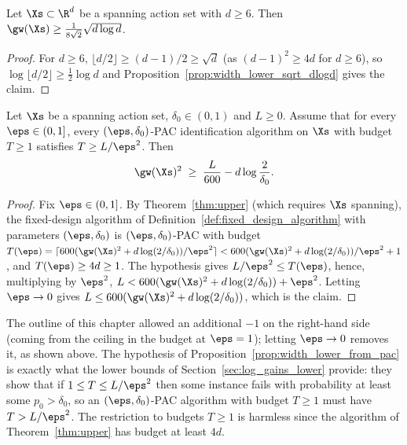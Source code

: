 \begin{corollary}\label{cor:width_lower_sqrt_dlogd}
Let $\Xs \subset \R^d$ be a spanning action set with $d \ge 6$. Then
$\gw(\Xs) \ge \frac{1}{8\sqrt 2}\sqrt{d\log d}$.
\end{corollary}
\begin{proof}
For $d \ge 6$, $\lfloor d/2\rfloor \ge (d-1)/2 \ge \sqrt d$ (as $(d-1)^2 \ge 4d$ for $d \ge 6$), so
$\log\lfloor d/2\rfloor \ge \frac12\log d$ and Proposition~\ref{prop:width_lower_sqrt_dlogd} gives
the claim.
\end{proof}


\begin{proposition}\label{prop:width_lower_from_pac}
Let $\Xs$ be a spanning action set, $\delta_0 \in (0,1)$ and $L \ge 0$. Assume that for every
$\eps \in (0,1]$, every $(\eps,\delta_0)$-PAC identification algorithm on $\Xs$ with budget
$T \ge 1$ satisfies $T \ge L/\eps^2$. Then
\[
  \gw(\Xs)^2 \;\ge\; \frac{L}{600} - d\log\frac{2}{\delta_0}.
\]
\end{proposition}

\begin{proof}
Fix $\eps \in (0,1]$. By Theorem~\ref{thm:upper} (which requires $\Xs$ spanning), the
fixed-design algorithm of
Definition~\ref{def:fixed_design_algorithm} with parameters $(\eps, \delta_0)$ is
$(\eps,\delta_0)$-PAC with budget
$T(\eps) = \lceil 600(\gw(\Xs)^2 + d\log(2/\delta_0))/\eps^2\rceil
< 600(\gw(\Xs)^2 + d\log(2/\delta_0))/\eps^2 + 1$, and $T(\eps) \ge 4d \ge 1$. The hypothesis gives
$L/\eps^2 \le T(\eps)$, hence, multiplying by $\eps^2$,
$L < 600(\gw(\Xs)^2 + d\log(2/\delta_0)) + \eps^2$. Letting $\eps \to 0$ gives
$L \le 600(\gw(\Xs)^2 + d\log(2/\delta_0))$, which is the claim.
\end{proof}

\begin{remark}
The outline of this chapter allowed an additional $-1$ on the right-hand side (coming from
the ceiling in the budget at $\eps = 1$); letting $\eps \to 0$ removes it, as shown above.
The hypothesis of Proposition~\ref{prop:width_lower_from_pac} is exactly what the lower
bounds of Section~\ref{sec:log_gains_lower} provide: they show that if
$1 \le T \le L/\eps^2$ then some instance fails with probability at least some $p_0 > \delta_0$,
so an $(\eps,\delta_0)$-PAC algorithm with budget $T \ge 1$ must have $T > L/\eps^2$. The
restriction to budgets $T \ge 1$ is harmless since the algorithm of Theorem~\ref{thm:upper}
has budget at least $4d$.
\end{remark}

